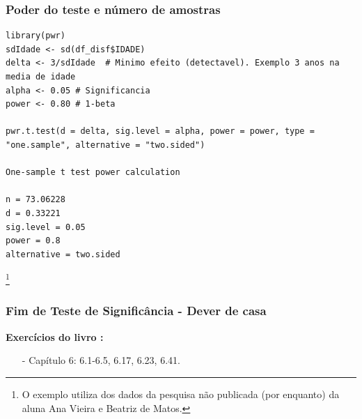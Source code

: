 \documentclass[graphics,14pt]{beamer}
\newcommand{\lfr}[1]{\let\thefootnote\relax\footnote{\hspace{0.6cm}\vspace{1.25cm} #1}}
\begin{document}
\begin{frame}[t,fragile=singleslide]
\frametitle{Poder do teste e número de amostras}

\begin{lstlisting}
library(pwr)
sdIdade <- sd(df_disf$IDADE)
delta <- 3/sdIdade  # Minimo efeito (detectavel). Exemplo 3 anos na media de idade
alpha <- 0.05 # Significancia
power <- 0.80 # 1-beta

pwr.t.test(d = delta, sig.level = alpha, power = power, type = "one.sample", alternative = "two.sided")

One-sample t test power calculation 

n = 73.06228
d = 0.33221
sig.level = 0.05
power = 0.8
alternative = two.sided
\end{lstlisting}

\lfr{O exemplo utiliza dos dados da pesquisa não publicada (por enquanto) da aluna Ana Vieira e Beatriz de Matos.}

\end{frame}
\begin{frame}[t,fragile=singleslide]
\frametitle{Fim de Teste de Significância - Dever de casa}
\textbf{Exercícios do livro \cite{Agresti2018}:}
\begin{itemize}
	\item[-] Capítulo 6: 6.1-6.5, 6.17, 6.23, 6.41.
\end{itemize}
\end{frame}
\end{document}

